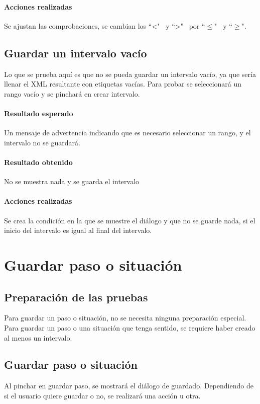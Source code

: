 \paragraph{Acciones realizadas}
Se ajustan las comprobaciones, se cambian los ``<" \ y ``>" \ por ``$\leq$" \ y ``$\geq$".

\subsection{Guardar un intervalo vac\'io}
Lo que se prueba aqu\'i es que no se pueda guardar un intervalo vac\'io, ya que ser\'ia
llenar el XML resultante con etiquetas vac\'ias. Para probar se seleccionar\'a un rango
vac\'io y se pinchar\'a en crear intervalo.

\paragraph{Resultado esperado}
Un mensaje de advertencia indicando que es necesario seleccionar un rango, y
el intervalo no se guardar\'a.

\paragraph{Resultado obtenido}
No se muestra nada y se guarda el intervalo

\paragraph{Acciones realizadas}
Se crea la condici\'on en la que se muestre el
di\'alogo y que no se guarde nada, si el inicio del intervalo
es igual al final del intervalo.

\section{Guardar paso o situaci\'on}
\subsection{Preparaci\'on de las pruebas}
Para guardar un paso o situaci\'on, no se necesita ninguna preparaci\'on especial.
Para guardar un paso o una situaci\'on que tenga sentido, se requiere 
haber creado al menos un 
intervalo. 

\subsection{Guardar paso o situaci\'on}
Al pinchar en guardar paso, se mostrar\'a el di\'alogo de guardado.
Dependiendo de si el usuario quiere guardar o no, se realizar\'a una
acci\'on u otra.

